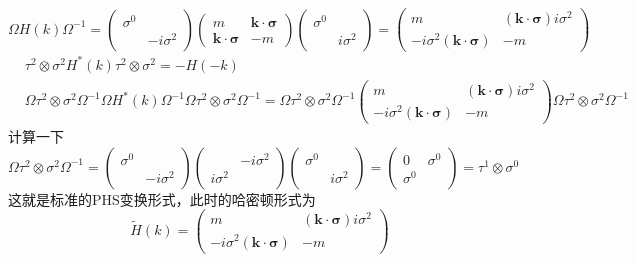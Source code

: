 \documentclass{article}
\numberwithin{equation}{subsection}
\begin{document}
\begin{equation*}
    \Omega H(k)\Omega^{-1}=\begin{pmatrix}
        \sigma^0&\\
        &-i\sigma^2
    \end{pmatrix}\begin{pmatrix}
        m&\bm{k}\cdot\bm{\sigma}\\
        \bm{k}\cdot\bm{\sigma}&-m
    \end{pmatrix}\begin{pmatrix}
        \sigma^0&\\
        &i\sigma^2
    \end{pmatrix}=\begin{pmatrix}
        m&(\bm{k}\cdot\bm{\sigma})i\sigma^2\\
        -i\sigma^2(\bm{k}\cdot\bm{\sigma})&-m
    \end{pmatrix}
\end{equation*}
\begin{equation*}
    \begin{split}
        &\tau^2\otimes\sigma^2H^*(k)\tau^2\otimes\sigma^2=-H(-k)\\
        &\Omega\tau^2\otimes\sigma^2\Omega^{-1}\Omega H^*(k)\Omega^{-1}\Omega\tau^2\otimes\sigma^2\Omega^{-1}=\Omega\tau^2\otimes\sigma^2\Omega^{-1}\begin{pmatrix}
            m&(\bm{k}\cdot\bm{\sigma})i\sigma^2\\
            -i\sigma^2(\bm{k}\cdot\bm{\sigma})&-m
        \end{pmatrix}\Omega\tau^2\otimes\sigma^2\Omega^{-1}
    \end{split}
\end{equation*}
计算一下
\begin{equation*}
    \Omega\tau^2\otimes\sigma^2\Omega^{-1}=\begin{pmatrix}
        \sigma^0&\\
        &-i\sigma^2
    \end{pmatrix}\begin{pmatrix}
        &-i\sigma^2\\
        i\sigma^2&
    \end{pmatrix}\begin{pmatrix}
        \sigma^0&\\
        &i\sigma^2
    \end{pmatrix}=\begin{pmatrix}
        0&\sigma^0\\
        \sigma^0&
    \end{pmatrix}=\tau^1\otimes\sigma^0
\end{equation*}
这就是标准的PHS变换形式，此时的哈密顿形式为
\begin{equation}
    \tilde{H}(k)=\begin{pmatrix}
        m&(\bm{k}\cdot\bm{\sigma})i\sigma^2\\
        -i\sigma^2(\bm{k}\cdot\bm{\sigma})&-m
    \end{pmatrix}
\end{equation}
\end{document}
